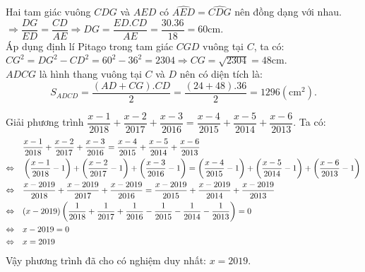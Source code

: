 \begin{ex}
{\begin{enumerate}
    		Hai tam giác vuông $CDG$ và $AED$ có $\widehat{AED} = \widehat{CDG}$ nên đồng dạng với nhau.\\
    		$\Rightarrow \dfrac{DG}{ED} = \dfrac{CD}{AE} \Rightarrow DG = \dfrac{ED.CD}{AE} = \dfrac{30.36}{18} = 60$cm.\\
    		Áp dụng định lí Pitago trong tam giác $CGD$ vuông tại $C$, ta có: $CG^2 = DG^2 - CD^2 = 60^2 - 36^2 = 2304 \Rightarrow CG = \sqrt{2304} = 48$cm.\\
    		$ADCG$ là hình thang vuông tại $C$ và $D$ nên có diện tích là:
    		$$S_{ADCD} = \dfrac{(AD + CG).CD}{2} = \dfrac{(24 + 48).36}{2} = 1296 (\mathrm{cm}^2).$$
    \end{enumerate}
    }
\end{ex}

\begin{ex}%
    Giải phương trình $\dfrac{x-1}{2018} + \dfrac{x-2}{2017} + \dfrac{x-3}{2016} = \dfrac{x-4}{2015} + \dfrac{x-5}{2014} + \dfrac{x-6}{2013}$.
\loigiai
    {
	Ta có:    
    	$$
        \begin{aligned}
        	&\quad \dfrac{x-1}{2018} + \dfrac{x-2}{2017} + \dfrac{x-3}{2016} = \dfrac{x-4}{2015} + \dfrac{x-5}{2014} + \dfrac{x-6}{2013}\\
        	\Leftrightarrow &\quad \left(\dfrac{x-1}{2018} - 1\right) + \left(\dfrac{x-2}{2017} - 1\right) + \left(\dfrac{x-3}{2016} - 1\right) = \left(\dfrac{x-4}{2015} - 1\right) + \left(\dfrac{x-5}{2014} - 1\right) + \left(\dfrac{x-6}{2013} - 1\right)\\
        	\Leftrightarrow &\quad \dfrac{x-2019}{2018} + \dfrac{x-2019}{2017} + \dfrac{x-2019}{2016} = \dfrac{x-2019}{2015} + \dfrac{x-2019}{2014} + \dfrac{x-2019}{2013}\\
        	\Leftrightarrow &\quad (x-2019)\left(\dfrac{1}{2018} + \dfrac{1}{2017} + \dfrac{1}{2016} - \dfrac{1}{2015} - \dfrac{1}{2014} - \dfrac{1}{2013}\right) = 0\\
        	\Leftrightarrow &\quad x - 2019 = 0\\
        	\Leftrightarrow &\quad x = 2019\\      		
        \end{aligned}\\
        $$
        		Vậy phương trình đã cho có nghiệm duy nhất: $x = 2019$.
    }
\end{ex}

